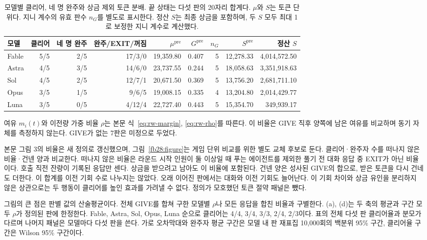 {\begin{table}[t]
\color{blue}\centering\small
\setlength{\tabcolsep}{3pt}
\caption{모델별 클리어, 네 명 완주와 상금 제외 토큰 분배. 끝 상태는 다섯 판의 20자리 합계다. $\mu$와 $S$는 토큰 단위다. 지니 계수의 유효 판수 $n_G$를 별도로 표시한다. 정산 $S$는 최종 상금을 포함하며, 두 $S$ 모두 최대 1로 보정한 지니 계수로 계산했다.}\label{fb28:table}
\begin{tabular}{@{}lrrrrrrrr@{}}
\toprule
모델 & 클리어 & 네 명 완주 & 완주/EXIT/꺼짐 & $\mu^{\mathrm{pre}}$ & $G^{\mathrm{pre}}$ & $n_G$ & $S^{\mathrm{pre}}$ & 정산 $S$ \\
\midrule
Fable & 5/5 & 2/5 & 17/3/0 & 19,359.80 & 0.407 & 5 & 12,278.33 & 4,014,572.50 \\
Astra & 4/5 & 3/5 & 14/6/0 & 23,737.55 & 0.244 & 5 & 18,058.63 & 3,351,918.63 \\
Sol & 4/5 & 2/5 & 12/7/1 & 20,671.50 & 0.369 & 5 & 13,756.20 & 2,681,711.10 \\
Opus & 3/5 & 1/5 & 9/6/5 & 19,008.15 & 0.335 & 4 & 13,204.80 & 2,014,429.77 \\
Luna & 3/5 & 0/5 & 4/12/4 & 22,727.40 & 0.443 & 5 & 15,354.70 & 349,939.17 \\
\bottomrule
\end{tabular}
\end{table}

여유 $m_i(t)$와 이전량 가중 비율 $\rho$는 본문 식~\eqref{eq:rw-margin}, \eqref{eq:rw-rho}를 따른다. 이 비율은 GIVE 직후 양쪽에 남은 여유를 비교하며 동기 자체를 측정하지 않는다. GIVE가 없는 7판은 미정으로 두었다.

본문 그림 3의 비율은 새 정의로 갱신했으며, 그림~\ref{fb28:figure}는 게임 단위 비교를 위한 별도 교체 후보로 둔다. 클리어·완주자 수를 떠나지 않은 비율·건넨 양과 비교한다. 떠나지 않은 비율은 라운드 시작 인원이 둘 이상일 때 푸는 에이전트를 제외한 풀기 전 대화 응답 중 EXIT가 아닌 비율이다. 호출 직전 잔량이 기록된 응답만 센다. 상금을 받으려고 남아도 이 비율에 포함된다. 건넨 양은 성사된 GIVE의 합으로, 받은 토큰을 다시 건네도 더한다. 이 합계를 이전 기회 수로 나누지는 않았다. 오래 이어진 판에서는 대화와 이전 기회도 늘어난다. 이 기회 차이와 상금 유인을 분리하지 않은 상관으로는 두 행동이 클리어를 높인 효과를 가려낼 수 없다. 정의가 모호했던 토큰 절약 패널은 뺐다.

그림의 큰 점은 판별 값의 산술평균이다. 전체 GIVE를 합쳐 구한 모델별 $\rho$나 모든 응답을 합친 비율과 구별한다. (a), (d)는 두 축의 평균과 구간 모두 $\rho$가 정의된 판에 한정한다. Fable, Astra, Sol, Opus, Luna 순으로 클리어는 4/4, 3/4, 3/3, 2/4, 2/3이다. 표의 전체 다섯 판 클리어율과 분모가 다르며 나머지 패널은 모델마다 다섯 판을 쓴다. 가로 오차막대와 완주자 평균 구간은 모델 내 판 재표집 10,000회의 백분위 95\% 구간, 클리어율 구간은 Wilson 95\% 구간이다.

}
